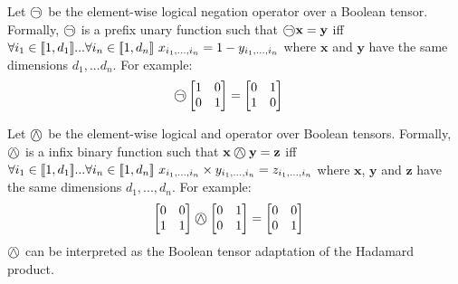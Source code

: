 \begin{definition}
	\label{tensornot}
	
	Let $\incircbin{\neg}$ be the element-wise logical negation operator over a Boolean tensor. Formally, $\incircbin{\neg}$ is a prefix unary function such that $\incircbin{\neg}\mathbf{x}=\mathbf{y}$ iff $\forall i_1\in[\![{1,d_1}]\!]...\forall i_n\in[\![{1,d_n}]\!]\ x_{i_1,...,i_n}=1-y_{i_1,...,i_n}$ where $\mathbf{x}$ and $\mathbf{y}$ have the same dimensions $d_1,...d_n$.
	\linespace
	For example:
	\begin{align*}
		\incircbin{\neg}
		\begin{bmatrix}
		1&0\\
		0&1\\
		\end{bmatrix}&=
		\begin{bmatrix}
			0&1\\
			1&0\\
		\end{bmatrix}
	\end{align*}
\end{definition}

\begin{definition}
	\label{tensorand}
	
	Let $\incircbin{\land}$ be the element-wise logical and operator over Boolean tensors. Formally, $\incircbin{\land}$ is a infix binary function such that $\mathbf{x}\incircbin{\land}\mathbf{y}=\mathbf{z}$ iff $\forall i_1\in[\![{1,d_1}]\!]...\forall i_n\in[\![{1,d_n}]\!]\ x_{i_1,...,i_n}\times y_{i_1,...,i_n}=z_{i_1,...,i_n}$ where $\mathbf{x}$, $\mathbf{y}$ and $\mathbf{z}$ have the same dimensions $d_1,...,d_n$.
	\linespace
	For example:
	\begin{align*}
	\begin{bmatrix}
	0&0\\
	1&1\\
	\end{bmatrix}
	\incircbin{\land}
	\begin{bmatrix}
	0&1\\
	0&1\\
	\end{bmatrix}
	&=
	\begin{bmatrix}
	0&0\\
	0&1\\
	\end{bmatrix}
	\end{align*}
	\linespace
	$\incircbin{\land}$ can be interpreted as the Boolean tensor adaptation of the Hadamard product.
\end{definition}


